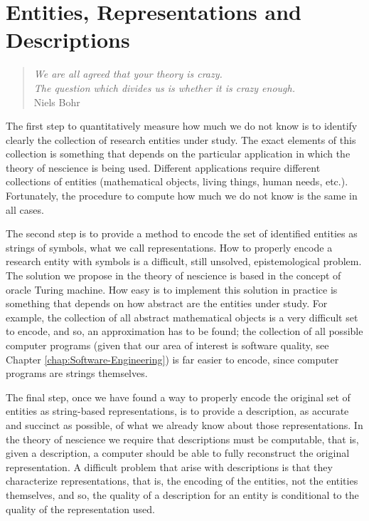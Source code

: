 %
%


\chapter{Entities, Representations and Descriptions}
\label{cha:Topics-and-Descriptions}

\begin{quote}
\begin{flushright}
\emph{We are all agreed that your theory is crazy. \\
The question which divides us is whether it is crazy enough.} \\
Niels Bohr
\end{flushright}
\end{quote}
\bigskip

The first step to quantitatively measure how much we do not know is to identify clearly the collection of research entities under study. The exact elements of this collection is something that depends on the particular application in which the theory of nescience is being used. Different applications require different collections of entities (mathematical objects, living things, human needs, etc.). Fortunately, the procedure to compute how much we do not know is the same in all cases.

The second step is to provide a method to encode the set of identified entities as strings of symbols, what we call representations. How to properly encode a research entity with symbols is a difficult, still unsolved, epistemological problem. The solution we propose in the theory of nescience is based in the concept of oracle Turing machine. How easy is to implement this solution in practice is something that depends on how abstract are the entities under study. For example, the collection of all abstract mathematical objects is a very difficult set to encode, and so, an approximation has to be found; the collection of all possible computer programs (given that our area of interest is software quality, see Chapter \ref{chap:Software-Engineering}) is far easier to encode, since computer programs are strings themselves.

The final step, once we have found a way to properly encode the original set of entities as string-based representations, is to provide a description, as accurate and succinct as possible, of what we already know about those representations. In the theory of nescience we require that descriptions must be computable, that is, given a description, a computer should be able to fully reconstruct the original representation. A difficult problem that arise with descriptions is that they characterize representations, that is, the encoding of the entities, not the entities themselves, and so, the quality of a description for an entity is conditional to the quality of the representation used.


